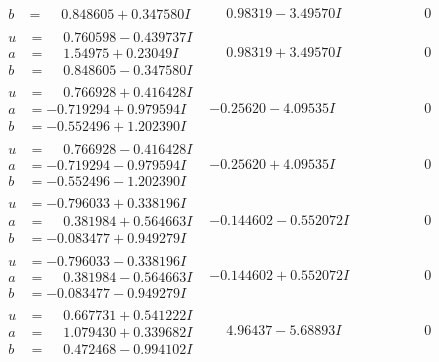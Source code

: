 \documentclass[1p]{elsarticle_modified}
\theoremstyle{definition}
\begin{document}
$$\begin{array}{c|c|c}
\begin{aligned}
b &= \phantom{-}0.848605 + 0.347580 I\end{aligned}
 & \phantom{-}0.98319 - 3.49570 I & \phantom{-0.000000 } 0 \\ \hline\begin{aligned}
u &= \phantom{-}0.760598 - 0.439737 I \\
a &= \phantom{-}1.54975 + 0.23049 I \\
b &= \phantom{-}0.848605 - 0.347580 I\end{aligned}
 & \phantom{-}0.98319 + 3.49570 I & \phantom{-0.000000 } 0 \\ \hline\begin{aligned}
u &= \phantom{-}0.766928 + 0.416428 I \\
a &= -0.719294 + 0.979594 I \\
b &= -0.552496 + 1.202390 I\end{aligned}
 & -0.25620 - 4.09535 I & \phantom{-0.000000 } 0 \\ \hline\begin{aligned}
u &= \phantom{-}0.766928 - 0.416428 I \\
a &= -0.719294 - 0.979594 I \\
b &= -0.552496 - 1.202390 I\end{aligned}
 & -0.25620 + 4.09535 I & \phantom{-0.000000 } 0 \\ \hline\begin{aligned}
u &= -0.796033 + 0.338196 I \\
a &= \phantom{-}0.381984 + 0.564663 I \\
b &= -0.083477 + 0.949279 I\end{aligned}
 & -0.144602 - 0.552072 I & \phantom{-0.000000 } 0 \\ \hline\begin{aligned}
u &= -0.796033 - 0.338196 I \\
a &= \phantom{-}0.381984 - 0.564663 I \\
b &= -0.083477 - 0.949279 I\end{aligned}
 & -0.144602 + 0.552072 I & \phantom{-0.000000 } 0 \\ \hline\begin{aligned}
u &= \phantom{-}0.667731 + 0.541222 I \\
a &= \phantom{-}1.079430 + 0.339682 I \\
b &= \phantom{-}0.472468 - 0.994102 I\end{aligned}
 & \phantom{-}4.96437 - 5.68893 I & \phantom{-0.000000 } 0 \\ \hline\begin{aligned}

\end{aligned}
\end{array}$$
\end{document}
